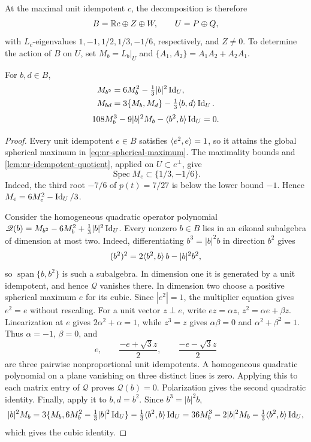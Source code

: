 At the maximal unit idempotent $c$, the decomposition is therefore
\[
 B=\mathbb R c\oplus Z\oplus W,\qquad U=P\oplus Q,
\]
with $L_c$-eigenvalues $1,-1,1/2,1/3,-1/6$, respectively, and $Z\ne0$.
To determine the action of $B$ on $U$, set $M_b=L_b|_U$ and
$\{A_1,A_2\}=A_1A_2+A_2A_1$.

\begin{proposition}\label{prop:nr-representation-identities}
For $b,d\in B$,
\begin{equation}\label{eq:nr-representation-quadratic}
\begin{aligned}
 M_{b^2}&=6M_b^2-\tfrac13|b|^2\operatorname{Id}_U,\\
 M_{bd}&=3\{M_b,M_d\}-\tfrac13\langle b,d\rangle\operatorname{Id}_U.
\end{aligned}
\end{equation}
\begin{equation}\label{eq:nr-representation-cubic}
 108M_b^3-9|b|^2M_b-\langle b^2,b\rangle\operatorname{Id}_U=0.
\end{equation}
\end{proposition}
\begin{proof}
Every unit idempotent $e\in B$ satisfies $\langle e^2,e\rangle=1$, so it
attains the global spherical maximum in
\eqref{eq:nr-spherical-maximum}.
The maximality bounds and \cref{lem:nr-idempotent-quotient}, applied
on $U\subset e^\perp$, give
\[
 \operatorname{Spec}M_e\subset\{1/3,-1/6\}.
\]
Indeed, the third root $-7/6$ of $p(t)=7/27$ is below the lower
bound $-1$. Hence
$M_e=6M_e^2-\operatorname{Id}_U/3$.

Consider the homogeneous quadratic operator polynomial \(\mathscr Q(b)=M_{b^2}-6M_b^2+\tfrac13|b|^2\operatorname{Id}_U\).
Every nonzero $b\in B$ lies in an eikonal subalgebra of dimension
at most two. Indeed, differentiating $b^3=|b|^2b$ in direction $b^2$
gives
\[
 (b^2)^2=2\langle b^2,b\rangle\,b-|b|^2b^2,
\]
so $\operatorname{span}\{b,b^2\}$ is such a subalgebra.
In dimension one it is generated by a unit idempotent, and hence
$\mathscr Q$ vanishes there.
In dimension two choose a positive spherical maximum $e$ for its cubic.
Since $|e^2|=1$, the multiplier equation gives $e^2=e$ without
rescaling. For a unit vector $z\perp e$, write
$ez=\alpha z$, $z^2=\alpha e+\beta z$.
Linearization at $e$ gives $2\alpha^2+\alpha=1$, while $z^3=z$
gives $\alpha\beta=0$ and $\alpha^2+\beta^2=1$.
Thus $\alpha=-1$, $\beta=0$, and
\[
 e,\qquad \frac{-e+\sqrt3z}{2},\qquad
 \frac{-e-\sqrt3z}{2}
\]
are three pairwise nonproportional unit idempotents.
A homogeneous quadratic polynomial on a plane vanishing on three
distinct lines is zero. Applying this to each matrix entry of
$\mathscr Q$ proves $\mathscr Q(b)=0$.
Polarization gives the second quadratic identity.
Finally, apply it to $b,d=b^2$. Since $b^3=|b|^2b$,
\[
 |b|^2M_b
 =3\{M_b,6M_b^2-\tfrac13|b|^2\operatorname{Id}_U\}
       -\tfrac13\langle b^2,b\rangle\operatorname{Id}_U
 =36M_b^3-2|b|^2M_b-\tfrac13\langle b^2,b\rangle\operatorname{Id}_U,
\]
which gives the cubic identity.
\end{proof}

